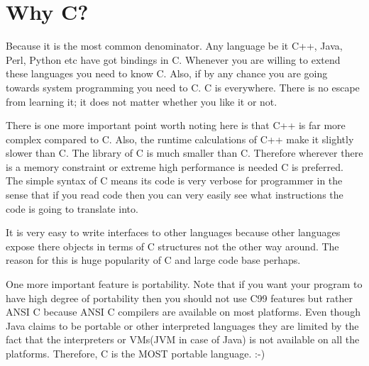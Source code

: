 \section{Why C?}
Because it is the most common denominator. Any language be it C++, Java, Perl,
Python etc have got bindings in C. Whenever you are willing to extend these
languages you need to know C. Also, if by any chance you are going towards
system programming you need to C. C is everywhere. There is no escape from
learning it; it does not matter whether you like it or not.

There is one more important point worth noting here is that C++ is far more
complex compared to C. Also, the runtime calculations of C++ make it slightly
slower than C. The library of C is much smaller than C. Therefore wherever
there is a memory constraint or extreme high performance is needed C is
preferred. The simple syntax of C means its code is very verbose for programmer
in the sense that if you read code then you can very easily see what
instructions the code is going to translate into.

It is very easy to write interfaces to other languages because other languages
expose there objects in terms of C structures not the other way around. The
reason for this is huge popularity of C and large code base perhaps.

One more important feature is portability. Note that if you want your program
to have high degree of portability then you should not use C99 features but
rather ANSI C because ANSI C compilers are available on most platforms. Even
though Java claims to be portable or other interpreted languages they are
limited by the fact that the interpreters or VMs(JVM in case of Java) is not
available on all the platforms. Therefore, C is the MOST portable language. :-)

